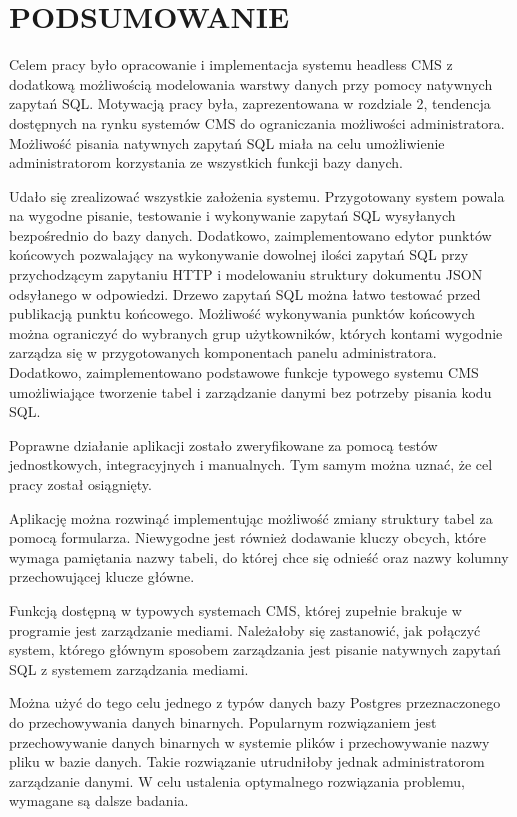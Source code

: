 \section{PODSUMOWANIE}

Celem pracy było opracowanie i implementacja systemu headless CMS z dodatkową
możliwością modelowania warstwy danych przy pomocy natywnych zapytań SQL.
Motywacją pracy była, zaprezentowana w rozdziale 2, tendencja dostępnych na
rynku systemów CMS do ograniczania możliwości administratora. Możliwość pisania
natywnych zapytań SQL miała na celu umożliwienie administratorom korzystania ze
wszystkich funkcji bazy danych.

Udało się zrealizować wszystkie założenia systemu. Przygotowany system powala na
wygodne pisanie, testowanie i wykonywanie zapytań SQL wysyłanych bezpośrednio do
bazy danych. Dodatkowo, zaimplementowano edytor punktów końcowych pozwalający na
wykonywanie dowolnej ilości zapytań SQL przy przychodzącym zapytaniu HTTP i
modelowaniu struktury dokumentu JSON odsyłanego w odpowiedzi. Drzewo zapytań SQL
można łatwo testować przed publikacją punktu końcowego. Możliwość wykonywania
punktów końcowych można ograniczyć do wybranych grup użytkowników, których
kontami wygodnie zarządza się w przygotowanych komponentach panelu
administratora. Dodatkowo, zaimplementowano podstawowe funkcje typowego systemu
CMS umożliwiające tworzenie tabel i zarządzanie danymi bez potrzeby pisania kodu
SQL.


Poprawne działanie aplikacji zostało zweryfikowane za pomocą testów
jednostkowych, integracyjnych i manualnych. Tym samym można uznać, że cel pracy
został osiągnięty.

\medspace

Aplikację można rozwinąć implementując możliwość zmiany struktury tabel za
pomocą formularza. Niewygodne jest również dodawanie kluczy obcych, które wymaga
pamiętania nazwy tabeli, do której chce się odnieść oraz nazwy kolumny
przechowującej klucze główne.

Funkcją dostępną w typowych systemach CMS, której zupełnie brakuje w programie
jest zarządzanie mediami. Należałoby się zastanowić, jak połączyć system,
którego głównym sposobem zarządzania jest pisanie natywnych zapytań SQL z
systemem zarządzania mediami.

Można użyć do tego celu jednego z typów danych bazy Postgres przeznaczonego do
przechowywania danych binarnych. Popularnym rozwiązaniem jest przechowywanie
danych binarnych w systemie plików i przechowywanie nazwy pliku w bazie danych.
Takie rozwiązanie utrudniłoby jednak administratorom zarządzanie danymi. W celu
ustalenia optymalnego rozwiązania problemu, wymagane są dalsze badania.

